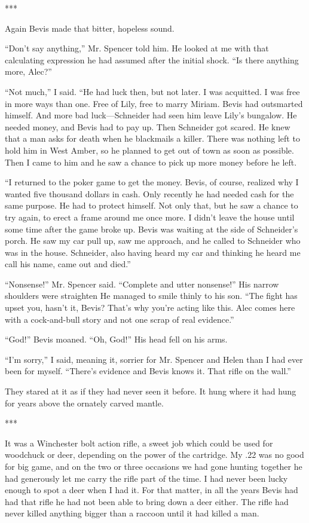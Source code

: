 \documentclass{novel}
\begin{document}
{***

Again Bevis made that bitter, hopeless sound.

“Don’t say anything,” Mr. Spencer told him. He looked at me with that calculating expression he had assumed after the initial shock. “Is there anything more, Alec?”

“Not much,” I said. “He had luck then, but not later. I was acquitted. I was free in more ways than one. Free of Lily, free to marry Miriam. Bevis had outsmarted himself. And more bad luck—Schneider had seen him leave Lily’s bungalow. He needed money, and Bevis had to pay up. Then Schneider got scared. He knew that a man asks for death when he blackmails a killer. There was nothing left to hold him in West Amber, so he planned to get out of town as soon as possible. Then I came to him and he saw a chance to pick up more money before he left.

“I returned to the poker game to get the money. Bevis, of course, realized why I wanted five thousand dollars in cash. Only recently he had needed cash for the same purpose. He had to protect himself. Not only that, but he saw a chance to try again, to erect a frame around me once more. I didn’t leave the house until some time after the game broke up. Bevis was waiting at the side of Schneider’s porch. He saw my car pull up, saw me approach, and he called to Schneider who was in the house. Schneider, also having heard my car and thinking he heard me call his name, came out and died.”

“Nonsense!” Mr. Spencer said. “Complete and utter nonsense!” His narrow shoulders were straighten He managed to smile thinly to his son. “The fight has upset you, hasn’t it, Bevis? That’s why you’re acting like this. Alec comes here with a cock-and-bull story and not one scrap of real evidence.”

“God!” Bevis moaned. “Oh, God!” His head fell on his arms.

“I’m sorry,” I said, meaning it, sorrier for Mr. Spencer and Helen than I had ever been for myself. “There’s evidence and Bevis knows it. That rifle on the wall.”

They stared at it as if they had never seen it before. It hung where it had hung for years above the ornately carved mantle.

***

It was a Winchester bolt action rifle, a sweet job which could be used for woodchuck or deer, depending on the power of the cartridge. My .22 was no good for big game, and on the two or three occasions we had gone hunting together he had generously let me carry the rifle part of the time. I had never been lucky enough to spot a deer when I had it. For that matter, in all the years Bevis had had that rifle he had not been able to bring down a deer either. The rifle had never killed anything bigger than a raccoon until it had killed a man.

}
\end{document}
